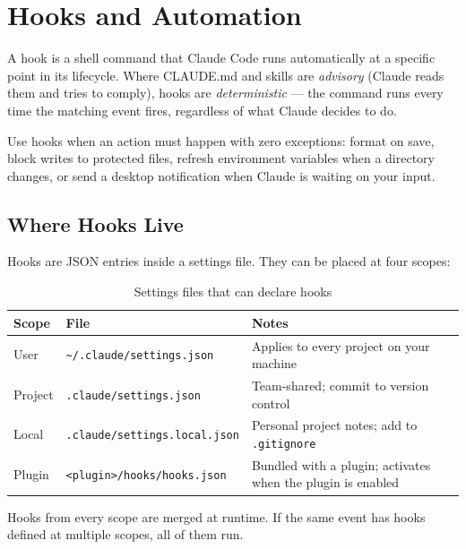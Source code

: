 \chapter{Hooks and Automation}
\label{ch:hooks}


A hook is a shell command that Claude Code runs automatically at a specific
point in its lifecycle. Where CLAUDE.md and skills are \emph{advisory} (Claude
reads them and tries to comply), hooks are \emph{deterministic} — the command
runs every time the matching event fires, regardless of what Claude decides
to do.

Use hooks when an action must happen with zero exceptions: format on save,
block writes to protected files, refresh environment variables when a
directory changes, or send a desktop notification when Claude is waiting on
your input.

\section{Where Hooks Live}
\label{sec:hook-location}


Hooks are JSON entries inside a settings file. They can be placed at four
scopes:

\begin{table}[ht]
\centering
\caption{Settings files that can declare hooks}
\label{tab:hook-scopes}
\begin{tabularx}{\textwidth}{llX}
\toprule
\textbf{Scope} & \textbf{File} & \textbf{Notes} \\
\midrule
User    & \texttt{\textasciitilde/.claude/settings.json}
        & Applies to every project on your machine \\
Project & \texttt{.claude/settings.json}
        & Team-shared; commit to version control \\
Local   & \texttt{.claude/settings.local.json}
        & Personal project notes; add to \texttt{.gitignore} \\
Plugin  & \texttt{<plugin>/hooks/hooks.json}
        & Bundled with a plugin; activates when the plugin is enabled \\
\bottomrule
\end{tabularx}
\end{table}

Hooks from every scope are merged at runtime. If the same event has hooks
defined at multiple scopes, all of them run.

